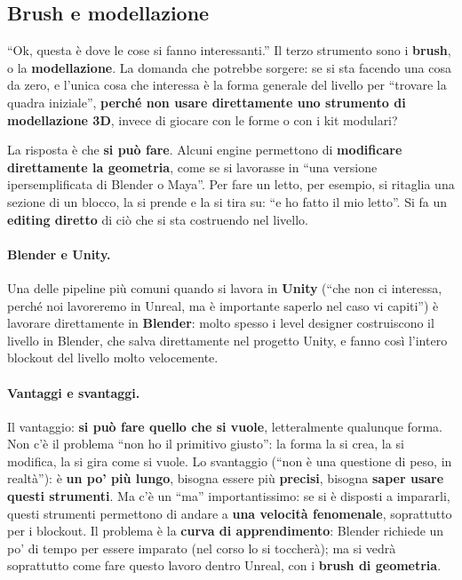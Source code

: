 \subsection{Brush e modellazione}
\label{gd11:sec:brush}

``Ok, questa è dove le cose si fanno interessanti.'' Il terzo strumento sono i
\textbf{brush}, o la \textbf{modellazione}. La domanda che potrebbe sorgere:
se si sta facendo una cosa da zero, e l'unica cosa che interessa è la forma
generale del livello per ``trovare la quadra iniziale'', \textbf{perché non
usare direttamente uno strumento di modellazione 3D}, invece di giocare con le
forme o con i kit modulari?

La risposta è che \textbf{si può fare}. Alcuni engine permettono di
\textbf{modificare direttamente la geometria}, come se si lavorasse in ``una
versione ipersemplificata di Blender o Maya''. Per fare un letto, per esempio,
si ritaglia una sezione di un blocco, la si prende e la si tira su: ``e ho fatto
il mio letto''. Si fa un \textbf{editing diretto} di ciò che si sta costruendo
nel livello.

\paragraph{Blender e Unity.} Una delle pipeline più comuni quando si lavora in
\textbf{Unity} (``che non ci interessa, perché noi lavoreremo in Unreal, ma è
importante saperlo nel caso vi capiti'') è lavorare direttamente in
\textbf{Blender}: molto spesso i level designer costruiscono il livello in
Blender, che salva direttamente nel progetto Unity, e fanno così l'intero
blockout del livello molto velocemente.

\paragraph{Vantaggi e svantaggi.} Il vantaggio: \textbf{si può fare quello che
si vuole}, letteralmente qualunque forma. Non c'è il problema ``non ho il
primitivo giusto'': la forma la si crea, la si modifica, la si gira come si
vuole. Lo svantaggio (``non è una questione di peso, in realtà''): è \textbf{un
po' più lungo}, bisogna essere più \textbf{precisi}, bisogna \textbf{saper usare
questi strumenti}. Ma c'è un ``ma'' importantissimo: se si è disposti a
impararli, questi strumenti permettono di andare a \textbf{una velocità
fenomenale}, soprattutto per i blockout. Il problema è la \textbf{curva di
apprendimento}: Blender richiede un po' di tempo per essere imparato (nel corso
lo si toccherà); ma si vedrà soprattutto come fare questo lavoro dentro Unreal,
con i \textbf{brush di geometria}.

